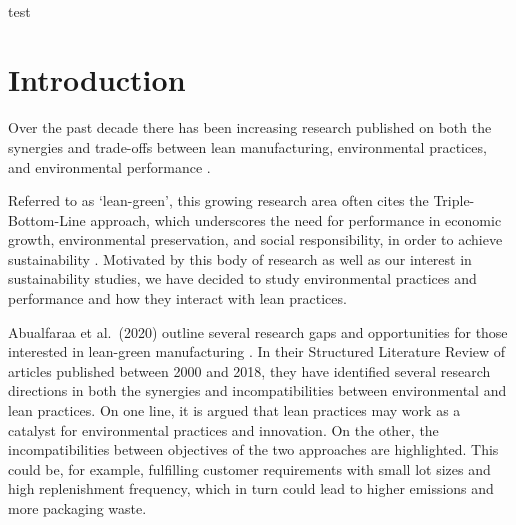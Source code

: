 \documentclass[]{article}
\makeatletter
\renewenvironment{abstract} {\vspace*{-1pc}\trivlist\item[]\leftskip\oupIndent\hrulefill\par\vskip4pt\noindent\textbf{\abstractname}\mbox{\null}\\}{\par\noindent\hrulefill\endtrivlist}
\def\author#1{\gdef\@author{\hskip-\dimexpr(\tabcolsep)\hskip\oupIndent\parbox{\dimexpr\textwidth-\oupIndent}{\centering\bfseries#1}}}
\def\title#1{\gdef\@title{\centering\bfseries\ifx\@articleType\@empty\else\@articleType\\\fi#1}}
\let\@articleType\@empty \def\articletype#1{\gdef\@articleType{{\normalfont\itshape#1}}}
\makeatother
\begin{document}
\title{Lean JIT and Environmental Performance: an empirical analysis}
\author{Alessa Aila\textsuperscript{1}\thanks{E-mail: alessa.aila@aalto.fi}{ },
            Astrid Holstr{\"{o}}m\textsuperscript{1}\thanks{E-mail: astrid.holmstrom@aalto.fi}{ },
            Eemil Rantala\textsuperscript{1}\thanks{E-mail: eemil.rantala@aalto.fi}{ },
            John Anderson\textsuperscript{1}\thanks{E-mail: john.anderson@aalto.fi}{ } and
            Valtteri Luodem{\"{a}}ki\textsuperscript{1}\thanks{E-mail: valtteri.luodemaki@aalto.fi}{ }~\\[-3pt]\normalsize\normalfont\itshape 
~\\\textsuperscript{1}{Department of Industrial Engineering and Management\unskip, Aalto University}}
\def\RunningHead{{Lean JIT and Environmental Performance: an empirical analysis}}

\maketitle 


\begin{abstract}
test
\end{abstract}\def\keywordstitle{Keywords}
    
\section{Introduction}
Over the past decade there has been increasing research published on both the synergies and trade-offs between lean manufacturing, environmental practices, and environmental performance \citep{henaoLeanManufacturingSustainable2019, abualfaraaLeanGreenManufacturingPractices2020, lobomesquitaExploringRelationshipsIntegrating2022, garza-reyesLeanGreenSystematic2015, kingLeanGreenEmpirical2009}.

Referred to as `lean-green', this growing research area often cites the Triple-Bottom-Line approach, which underscores the need for performance in economic growth, environmental preservation, and social responsibility, in order to achieve sustainability \citep{henaoLeanManufacturingSustainable2019}. Motivated by this body of research as well as our interest in sustainability studies, we have decided to study environmental practices and performance and how they interact with lean practices.

Abualfaraa et al.~(2020) outline several research gaps and opportunities for those interested in lean-green manufacturing \citep{abualfaraaLeanGreenManufacturingPractices2020}. In their Structured Literature Review of articles published between 2000 and 2018, they have identified several research directions in both the synergies and incompatibilities between environmental and lean practices. On one line, it is argued that lean practices may work as a catalyst for environmental practices and innovation. On the other, the incompatibilities between objectives of the two approaches are highlighted. This could be, for example, fulfilling customer requirements with small lot sizes and high replenishment frequency, which in turn could lead to higher emissions and more packaging waste.
\end{document}
